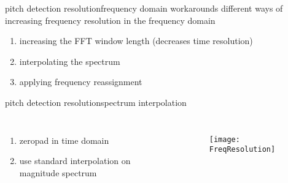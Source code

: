         \begin{frame}{pitch detection resolution}{frequency domain workarounds}
            different ways of increasing frequency resolution in the frequency domain
            \begin{enumerate}
                \item<1->   increasing the FFT window length (decreases time resolution)
                \bigskip
                \item<2->   interpolating  the spectrum
                \bigskip
                \item<3->   applying frequency reassignment
            \end{enumerate}
        \end{frame}

        \begin{frame}{pitch detection resolution}{spectrum interpolation}
            \begin{columns}
            \begin{enumerate}
                \item<1->   zeropad in time domain
                \bigskip
                \bigskip
                \bigskip
                \item<1->   use standard interpolation on magnitude spectrum
            \end{enumerate}
                \vspace{-6mm}
                \begin{figure}%
                \texttt{[image: FreqResolution]}%
                \end{figure}
            \end{columns}
        \end{frame}
